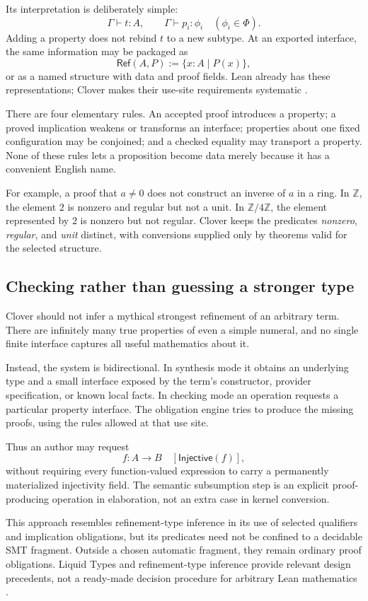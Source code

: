 \documentclass[11pt,a4paper]{article}
\newcommand{\Z}{\mathbb Z}
\newcommand{\CRef}{\mathsf{Ref}}
\theoremstyle{definition}
\theoremstyle{remark}
\begin{document}
Its interpretation is deliberately simple:
\[
 \Gamma\vdash t:A,
 \qquad
 \Gamma\vdash p_i:\phi_i \quad(\phi_i\in\Phi).
\]
Adding a property does not rebind $t$ to a new subtype. At an exported
interface, the same information may be packaged as
\[
 \CRef(A,P):=\{x:A\mid P(x)\},
\]
or as a named structure with data and proof fields. Lean already has these
representations; Clover makes their use-site requirements systematic
\cite{lean-subtype}.

There are four elementary rules. An accepted proof introduces a property;
a proved implication weakens or transforms an interface; properties about
one fixed configuration may be conjoined; and a checked equality may transport
a property. None of these rules lets a proposition become data merely because
it has a convenient English name.

For example, a proof that $a\ne0$ does not construct an inverse of $a$ in a
ring. In $\Z$, the element $2$ is nonzero and regular but not a unit. In
$\Z/4\Z$, the element represented by $2$ is nonzero but not regular. Clover
keeps the predicates \emph{nonzero}, \emph{regular}, and \emph{unit} distinct,
with conversions supplied only by theorems valid for the selected structure.

\subsection{Checking rather than guessing a stronger type}

Clover should not infer a mythical strongest refinement of an arbitrary term.
There are infinitely many true properties of even a simple numeral, and no
single finite interface captures all useful mathematics about it.

Instead, the system is bidirectional. In synthesis mode it obtains an
underlying type and a small interface exposed by the term's constructor,
provider specification, or known local facts. In checking mode an operation
requests a particular property interface. The obligation engine tries to
produce the missing proofs, using the rules allowed at that use site.

Thus an author may request
\[
 f:A\to B\quad[\mathsf{Injective}(f)],
\]
without requiring every function-valued expression to carry a permanently
materialized injectivity field. The semantic subsumption step is an explicit
proof-producing operation in elaboration, not an extra case in kernel
conversion.

This approach resembles refinement-type inference in its use of selected
qualifiers and implication obligations, but its predicates need not be confined
to a decidable SMT fragment. Outside a chosen automatic fragment, they remain
ordinary proof obligations. Liquid Types and refinement-type inference provide
relevant design precedents, not a ready-made decision procedure for arbitrary
Lean mathematics \cite{liquid,refinement-tutorial}.
\end{document}

